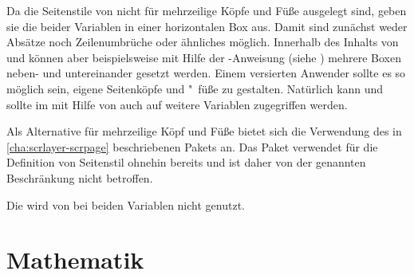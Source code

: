 Da die Seitenstile von  nicht für
mehrzeilige Köpfe und Füße ausgelegt sind, geben sie die beider Variablen in
einer horizontalen Box aus. Damit sind zunächst weder Absätze noch
Zeilenumbrüche oder ähnliches möglich.  Innerhalb des Inhalts von
 und  können aber beispielsweise mit
Hilfe der -Anweisung (siehe \cite{latex:usrguide-historic})
mehrere Boxen neben- und untereinander gesetzt werden.  Einem versierten
Anwender sollte es so möglich sein, eigene Seitenköpfe und "~füße zu
gestalten.  Natürlich kann und sollte im  mit Hilfe von
 auch auf weitere Variablen zugegriffen
werden.

Als Alternative für mehrzeilige Köpf und Füße bietet sich die Verwendung des
in \autoref{cha:scrlayer-scrpage} beschriebenen Pakets
%
 an. Das Paket
 verwendet für die
Definition von Seitenstil %
ohnehin bereits  und ist daher von der genannten
Beschränkung nicht betroffen.

Die  wird von \KOMAScript{} bei beiden Variablen
nicht genutzt.%
\EndIndexGroup%
\EndIndexGroup%
\EndIndexGroup






\section{Mathematik}
%
\BeginIndexGroup
{}%
%
%

